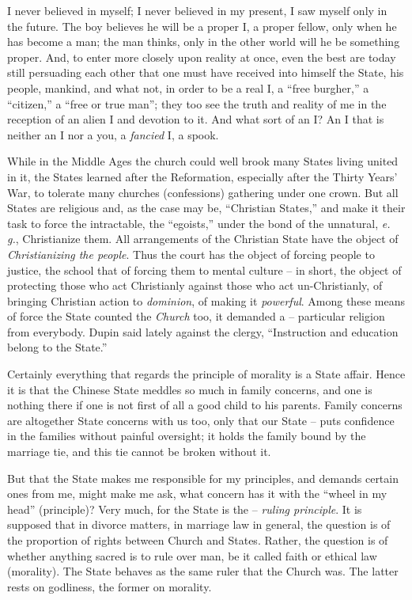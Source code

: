 \documentclass[12pt,a4paper]{book}
\begin{document}
I never believed in myself; I never believed in my present, I saw myself only 
in the future. The boy believes he will be a proper I, a proper fellow, only 
when he has become a man; the man thinks, only in the other world will he be 
something proper. And, to enter more closely upon reality at once, even the 
best are today still persuading each other that one must have received into 
himself the State, his people, mankind, and what not, in order to be a real I, 
a ``free burgher,'' a ``citizen,'' a ``free or true man''; they too see 
the truth and reality of me in the reception of an alien I and devotion to it. 
And what sort of an I? An I that is neither an I nor a you, a \textit{fancied} 
I, a spook.

While in the Middle Ages the church could well brook many States living united 
in it, the States learned after the Reformation, especially after the Thirty 
Years' War, to tolerate many churches (confessions) gathering under one crown. 
But all States are religious and, as the case may be, ``Christian States,'' 
and make it their task to force the intractable, the ``egoists,'' under the 
bond of the unnatural, \textit{e. g.}, Christianize them. All arrangements of 
the Christian State have the object of \textit{Christianizing the people}. 
Thus the court has the object of forcing people to justice, the school that of 
forcing them to mental culture -- in short, the object of protecting those who 
act Christianly against those who act un-Christianly, of bringing Christian 
action to \textit{dominion}, of making it \textit{powerful}. Among these means 
of force the State counted the \textit{Church} too, it demanded a -- 
particular religion from everybody. Dupin said lately against the clergy, 
``Instruction and education belong to the State.''

Certainly everything that regards the principle of morality is a State affair. 
Hence it is that the Chinese State meddles so much in family concerns, and one 
is nothing there if one is not first of all a good child to his parents. 
Family concerns are altogether State concerns with us too, only that our State 
-- puts confidence in the families without painful oversight; it holds the 
family bound by the marriage tie, and this tie cannot be broken without it.

But that the State makes me responsible for my principles, and demands certain 
ones from me, might make me ask, what concern has it with the ``wheel in my 
head'' (principle)? Very much, for the State is the -- \textit{ruling 
principle}. It is supposed that in divorce matters, in marriage law in 
general, the question is of the proportion of rights between Church and 
States. Rather, the question is of whether anything sacred is to rule over 
man, be it called faith or ethical law (morality). The State behaves as the 
same ruler that the Church was. The latter rests on godliness, the former on 
morality.
\end{document}
